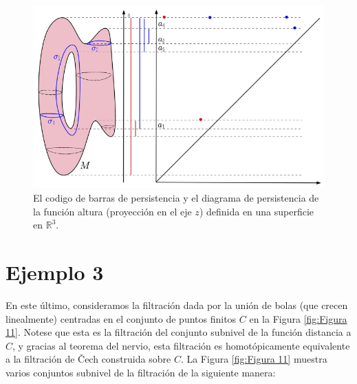 \begin{figure}[ht]
    \centering
    \includegraphics[width=0.85\linewidth]{./figures/Figura10.png}
    \caption{
        El codigo de barras de persistencia y el diagrama de persistencia de la funci\'on altura
        (proyecci\'on en el eje $z$) definida en una superficie en $\mathbb{R}^{3}$.
    }
    \label{fig:Figura 10}
    \vspace{15pt}
\end{figure}

\section*{Ejemplo 3}

En este \'ultimo, consideramos la filtraci\'on dada por la uni\'on de bolas
(que crecen linealmente)
centradas en el conjunto de puntos finitos $C$ en la Figura \ref{fig:Figura 11}.
Notese que esta es la filtraci\'on del conjunto subnivel de la funci\'on distancia a $C$,
y gracias al teorema del nervio,
esta filtraci\'on es homot\'opicamente equivalente a la filtraci\'on de \v Cech construida sobre $C$.
La Figura \ref{fig:Figura 11} muestra varios conjuntos subnivel de la filtraci\'on de la siguiente manera:

